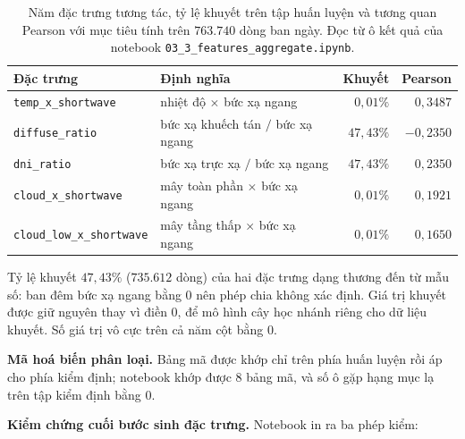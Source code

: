 \documentclass[12pt, a4paper]{report}
\begin{document}
\begin{table}[htbp]
\centering
\caption{Năm đặc trưng tương tác, tỷ lệ khuyết trên tập huấn luyện và tương quan Pearson với
mục tiêu tính trên $763.740$ dòng ban ngày. Đọc từ ô kết quả của notebook
\texttt{03\_3\_features\_aggregate.ipynb}.}
\label{tab:tuong_tac}
\small
\begin{tabular}{@{}L{5.0cm} L{4.6cm} r r@{}}
\toprule
\textbf{Đặc trưng} & \textbf{Định nghĩa} & \textbf{Khuyết} & \textbf{Pearson} \\
\midrule
\texttt{temp\_x\_shortwave} & nhiệt độ $\times$ bức xạ ngang & $0{,}01\%$ & $0{,}3487$ \\
\texttt{diffuse\_ratio} & bức xạ khuếch tán $/$ bức xạ ngang & $47{,}43\%$ & $-0{,}2350$ \\
\texttt{dni\_ratio} & bức xạ trực xạ $/$ bức xạ ngang & $47{,}43\%$ & $0{,}2350$ \\
\texttt{cloud\_x\_shortwave} & mây toàn phần $\times$ bức xạ ngang & $0{,}01\%$ & $0{,}1921$ \\
\texttt{cloud\_low\_x\_shortwave} & mây tầng thấp $\times$ bức xạ ngang & $0{,}01\%$ & $0{,}1650$ \\
\bottomrule
\end{tabular}
\end{table}

Tỷ lệ khuyết $47{,}43\%$ ($735.612$ dòng) của hai đặc trưng dạng thương đến từ mẫu số: ban
đêm bức xạ ngang bằng $0$ nên phép chia không xác định. Giá trị khuyết được giữ nguyên thay
vì điền $0$, để mô hình cây học nhánh riêng cho dữ liệu khuyết. Số giá trị vô cực trên cả
năm cột bằng $0$.

\textbf{Mã hoá biến phân loại.} Bảng mã được khớp chỉ trên phía huấn luyện rồi áp
cho phía kiểm định; notebook khớp được $8$ bảng mã, và số ô gặp hạng mục lạ trên tập kiểm
định bằng $0$.

\textbf{Kiểm chứng cuối bước sinh đặc trưng.} Notebook in ra ba phép kiểm:
\end{document}
